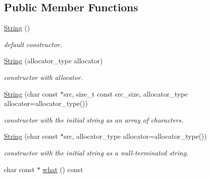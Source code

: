 \subsection*{Public Member Functions}
\begin{DoxyCompactItemize}
\item 
\hypertarget{classhryky_1_1error_1_1_string_afd94f4070319d5cc07a85ee9f2c85e6a}{\hyperlink{classhryky_1_1error_1_1_string_afd94f4070319d5cc07a85ee9f2c85e6a}{String} ()}\label{classhryky_1_1error_1_1_string_afd94f4070319d5cc07a85ee9f2c85e6a}

\begin{DoxyCompactList}\small\item\em default constructor. \end{DoxyCompactList}\item 
\hyperlink{classhryky_1_1error_1_1_string_aa6fc1b7d981fb0b99faf281186014aaf}{String} (allocator\-\_\-type allocator)
\begin{DoxyCompactList}\small\item\em constructor with allocator. \end{DoxyCompactList}\item 
\hypertarget{classhryky_1_1error_1_1_string_a4d29d7e082db33f34f47429b7266a755}{\hyperlink{classhryky_1_1error_1_1_string_a4d29d7e082db33f34f47429b7266a755}{String} (char const $\ast$src, size\-\_\-t const src\-\_\-size, allocator\-\_\-type allocator=allocator\-\_\-type())}\label{classhryky_1_1error_1_1_string_a4d29d7e082db33f34f47429b7266a755}

\begin{DoxyCompactList}\small\item\em constructor with the initial string as an array of characters. \end{DoxyCompactList}\item 
\hypertarget{classhryky_1_1error_1_1_string_a2bf4ca3662ca89efbb0f365bff90e84a}{\hyperlink{classhryky_1_1error_1_1_string_a2bf4ca3662ca89efbb0f365bff90e84a}{String} (char const $\ast$src, allocator\-\_\-type allocator=allocator\-\_\-type())}\label{classhryky_1_1error_1_1_string_a2bf4ca3662ca89efbb0f365bff90e84a}

\begin{DoxyCompactList}\small\item\em constructor with the initial string as a null-\/terminated string. \end{DoxyCompactList}\item 
\hypertarget{classhryky_1_1error_1_1_base_ada15aa71a7243d03e8229fbcf4e6f295}{char const $\ast$ \hyperlink{classhryky_1_1error_1_1_base_ada15aa71a7243d03e8229fbcf4e6f295}{what} () const }\label{classhryky_1_1error_1_1_base_ada15aa71a7243d03e8229fbcf4e6f295}


\end{DoxyCompactItemize}
